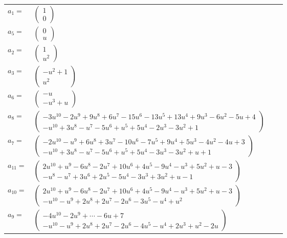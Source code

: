 \documentclass[1p]{elsarticle_modified}
\theoremstyle{definition}
\begin{document}
\begin{tabular}{m{7pt} m{180pt} m{7pt} m{180pt} }
\flushright $a_{1}=$&$\begin{pmatrix}1\\0\end{pmatrix}$ \\
\flushright $a_{5}=$&$\begin{pmatrix}0\\u\end{pmatrix}$ \\
\flushright $a_{2}=$&$\begin{pmatrix}1\\u^2\end{pmatrix}$ \\
\flushright $a_{3}=$&$\begin{pmatrix}- u^2+1\\u^2\end{pmatrix}$ \\
\flushright $a_{6}=$&$\begin{pmatrix}- u\\- u^3+u\end{pmatrix}$ \\
\flushright $a_{8}=$&$\begin{pmatrix}-3 u^{10}-2 u^9+9 u^8+6 u^7-15 u^6-13 u^5+13 u^4+9 u^3-6 u^2-5 u+4\\- u^{10}+3 u^8- u^7-5 u^6+u^5+5 u^4-2 u^3-3 u^2+1\end{pmatrix}$ \\
\flushright $a_{7}=$&$\begin{pmatrix}-2 u^{10}- u^9+6 u^8+3 u^7-10 u^6-7 u^5+9 u^4+5 u^3-4 u^2-4 u+3\\- u^{10}+3 u^8- u^7-5 u^6+u^5+5 u^4-3 u^3-3 u^2+u+1\end{pmatrix}$ \\
\flushright $a_{11}=$&$\begin{pmatrix}2 u^{10}+u^9-6 u^8-2 u^7+10 u^6+4 u^5-9 u^4- u^3+5 u^2+u-3\\- u^8- u^7+3 u^6+2 u^5-5 u^4-3 u^3+3 u^2+u-1\end{pmatrix}$ \\
\flushright $a_{10}=$&$\begin{pmatrix}2 u^{10}+u^9-6 u^8-2 u^7+10 u^6+4 u^5-9 u^4- u^3+5 u^2+u-3\\- u^{10}- u^9+2 u^8+2 u^7-2 u^6-3 u^5- u^4+u^2\end{pmatrix}$ \\
\flushright $a_{9}=$&$\begin{pmatrix}-4 u^{10}-2 u^9+\cdots-6 u+7\\- u^{10}- u^9+2 u^8+2 u^7-2 u^6-4 u^5- u^4+2 u^3+u^2-2 u\end{pmatrix}$ \\

\end{tabular}
\end{document}
